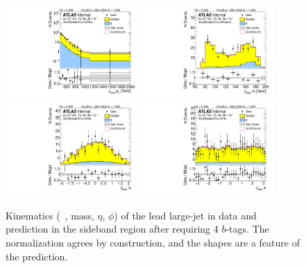 \begin{figure}[htbp!]
\begin{center}
\includegraphics[width=0.45\textwidth,angle=-90]{figures/boosted/Sideband/b77_FourTag_Sideband_leadHCand_Pt_m_1.pdf}
\includegraphics[width=0.45\textwidth,angle=-90]{figures/boosted/Sideband/b77_FourTag_Sideband_leadHCand_Mass_s.pdf}\\
\includegraphics[width=0.45\textwidth,angle=-90]{figures/boosted/Sideband/b77_FourTag_Sideband_leadHCand_Eta.pdf}
\includegraphics[width=0.45\textwidth,angle=-90]{figures/boosted/Sideband/b77_FourTag_Sideband_leadHCand_Phi.pdf}
  \caption{Kinematics (\pt~, mass, $\eta$, $\phi$) of the lead large-\R jet in data and prediction in the sideband region after requiring 4 $b$-tags. The normalization agrees by construction, and the shapes are a feature of the prediction.}
  \label{fig:boosted-4b-sideband-ak10-lead}
\end{center}
\end{figure}

